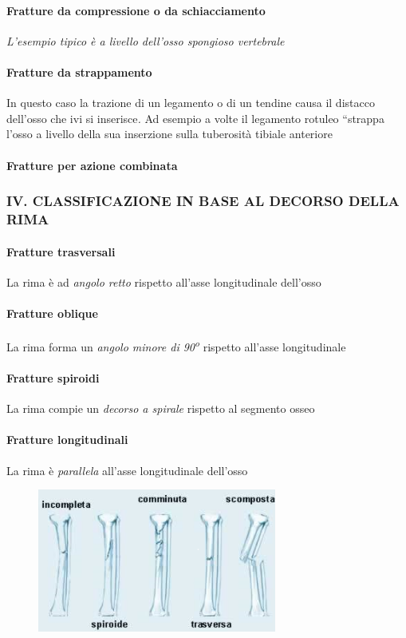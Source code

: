 \paragraph{Fratture da compressione o da schiacciamento}
\emph{L'esempio tipico è a livello dell'osso spongioso vertebrale}
\paragraph{Fratture da strappamento}
In questo caso la trazione di un legamento o di un tendine causa il distacco dell'osso che ivi si inserisce\emph{.} Ad esempio a volte il legamento rotuleo ``strappa l'osso a livello della sua inserzione sulla tuberosità tibiale anteriore
\paragraph{Fratture per azione combinata}


\subsubsection{IV. CLASSIFICAZIONE IN BASE AL DECORSO DELLA RIMA}

\paragraph{Fratture trasversali}
La rima è ad \emph{angolo retto} rispetto all'asse longitudinale dell'osso
\paragraph{Fratture oblique}
La rima forma un \emph{angolo minore di 90\textsuperscript{o}} rispetto all'asse longitudinale
\paragraph{Fratture spiroidi}
La rima compie un \emph{decorso a spirale} rispetto al segmento osseo
\paragraph{Fratture longitudinali}
La rima è \emph{parallela} all'asse longitudinale dell'osso

\begin{figure}[!ht]
\centering
\includegraphics[width=0.7\textwidth]{002/image4.png}
\end{figure}

